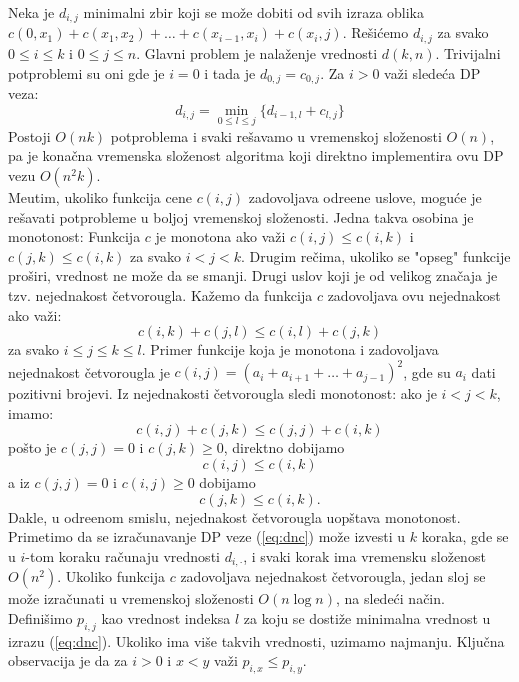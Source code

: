 \documentclass[a4paper,12pt]{article}
\numberwithin{equation}{subsection}
\begin{document}
Neka je $d_{i, j}$ minimalni zbir koji se mo\v ze dobiti od svih izraza oblika $c(0, x_1) + c(x_1, x_2) + \ldots + c(x_{i-1}, x_i) + c(x_i, j)$. Re\v si\' cemo $d_{i, j}$ za svako $0 \leq i \leq k$ i $0 \leq j \leq n$. Glavni problem je nala\v zenje vrednosti $d(k, n)$. Trivijalni potproblemi su oni gde je $i = 0$ i tada je $d_{0, j} = c_{0, j}$. Za $i > 0$ va\v zi slede\' ca DP veza:
\begin{equation} \label{eq:dnc}
	d_{i, j} = \min_{0 \leq l \leq j} \{ d_{i-1, l} + c_{l, j} \}
\end{equation}
Postoji $O(nk)$ potproblema i svaki re\v savamo u vremenskoj slo\v zenosti $O(n)$, pa je kona\v cna vremenska slo\v zenost algoritma koji direktno implementira ovu DP vezu $O(n^2k)$. 
\\

Me\dj utim, ukoliko funkcija cene $c(i,j)$ zadovoljava odre\dj ene uslove, mogu\' ce je re\v savati potprobleme u boljoj vremenskoj slo\v zenosti. Jedna takva osobina je monotonost: Funkcija $c$ je monotona ako va\v zi $c(i,j) \leq c(i,k)$ i $c(j,k) \leq c(i,k)$ za svako $i<j<k$. Drugim re\v cima, ukoliko se "opseg" funkcije pro\v siri, vrednost ne mo\v ze da se smanji. Drugi uslov koji je od velikog zna\v caja je tzv. nejednakost \v cetvorougla. Ka\v zemo da funkcija $c$ zadovoljava ovu nejednakost ako va\v zi:
\begin{equation} \label{eq:qineq}
	c(i,k)+c(j,l)\leq c(i,l)+c(j,k)
\end{equation}
za svako $i \leq j \leq k \leq l$. Primer funkcije koja je monotona i zadovoljava nejednakost \v cetvorougla je $c(i,j) = (a_i + a_{i+1} + \ldots + a_{j-1})^2$, gde su $a_i$ dati pozitivni brojevi. Iz nejednakosti \v cetvorougla sledi monotonost: ako je $i<j<k$, imamo:
$$
	c(i, j) + c(j, k) \leq c(j, j) + c(i, k)
$$
po\v sto je $c(j,j) = 0$ i $c(j, k) \geq 0$, direktno dobijamo
$$
	c(i, j) \leq c(i, k)
$$
a iz $c(j,j) = 0$ i $c(i, j) \geq 0$ dobijamo
$$
	c(j, k) \leq c(i, k).
$$
Dakle, u odre\dj enom smislu, nejednakost \v cetvorougla uop\v stava monotonost.
\\

Primetimo da se izra\v cunavanje DP veze (\ref{eq:dnc}) mo\v ze izvesti u $k$ koraka, gde se u $i$-tom koraku ra\v cunaju vrednosti $d_{i,\cdot}$, i svaki korak ima vremensku slo\v zenost $O(n^2)$. Ukoliko funkcija $c$ zadovoljava nejednakost \v cetvorougla, jedan sloj se mo\v ze izra\v cunati u vremenskoj slo\v zenosti $O(n \log n)$, na slede\' ci na\v cin. Defini\v simo $p_{i,j}$ kao vrednost indeksa $l$ za koju se dosti\v ze minimalna vrednost u izrazu (\ref{eq:dnc}). Ukoliko ima vi\v se takvih vrednosti, uzimamo najmanju. Klju\v cna observacija je da za $i>0$ i $x<y$ va\v zi $p_{i,x} \leq p_{i,y}$.
\\
\end{document}
